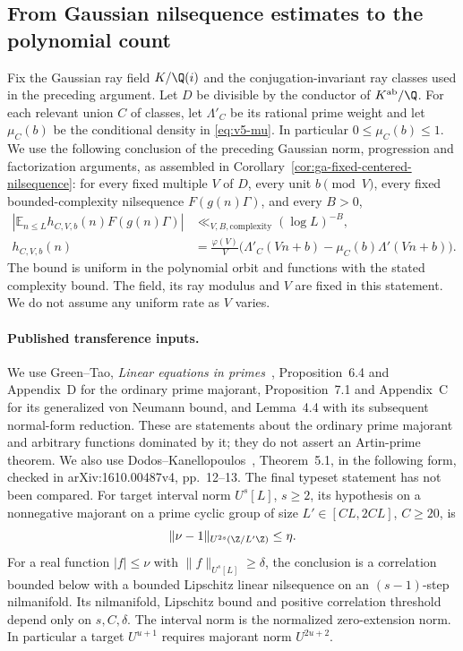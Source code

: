 \subsection{From Gaussian nilsequence estimates to the polynomial count}
\label{subsec:gaussian-gowers-bridge}

Fix the Gaussian ray field $K/\Q(i)$ and the conjugation-invariant ray
classes used in the preceding argument. Let $D$ be divisible by the
conductor of $K^{\rm ab}/\Q$. For each relevant union $C$ of classes,
let $\Lambda'_C$ be its rational prime weight and let $\mu_C(b)$ be the
conditional density in \eqref{eq:v5-mu}. In particular
$0\leq\mu_C(b)\leq1$. We use the following conclusion of the preceding
Gaussian norm, progression and factorization arguments, as assembled in
Corollary~\ref{cor:ga-fixed-centered-nilsequence}: for every fixed
multiple $V$ of $D$, every unit $b\pmod V$, every fixed bounded-complexity
nilsequence $F(g(n)\Gamma)$, and every $B>0$,
\begin{equation}\label{eq:gaussian-centered-nil-input}
\begin{aligned}
 \left|\mathbb E_{n\leq L}h_{C,V,b}(n)F(g(n)\Gamma)\right|
 &\ll_{V,B,\mathrm{complexity}}(\log L)^{-B},\\
 h_{C,V,b}(n)&=\frac{\varphi(V)}V
 \bigl(\Lambda'_C(Vn+b)-\mu_C(b)\Lambda'(Vn+b)\bigr).
\end{aligned}
\end{equation}
The bound is uniform in the polynomial orbit and functions with the stated
complexity bound. The field, its ray modulus and $V$ are fixed in this
statement. We do not assume any uniform rate as $V$ varies.

\paragraph{Published transference inputs.}
We use Green--Tao, \emph{Linear equations in primes}~\cite{greentao},
Proposition~6.4 and Appendix~D for the ordinary prime majorant,
Proposition~7.1 and Appendix~C for its generalized von Neumann bound,
and Lemma~4.4 with its subsequent normal-form reduction.
These are statements about the ordinary prime majorant and arbitrary
functions dominated by it; they do not assert an Artin-prime theorem.
We also use Dodos--Kanellopoulos~\cite{v5dk}, Theorem~5.1, in the
following form, checked in arXiv:1610.00487v4, pp.~12--13. The final
typeset statement has not been compared. For target interval norm $U^s[L]$, $s\geq2$, its hypothesis on a
nonnegative majorant on a prime cyclic group of size
$L'\in[CL,2CL]$, $C\geq20$, is
\begin{equation}\label{eq:gaussian-dk-correct-exponent}
 \|\nu-1\|_{U^{2s}(\Z/L'\Z)}\leq\eta.
\end{equation}
For a real function $|f|\leq\nu$ with $\|f\|_{U^s[L]}\geq\delta$,
the conclusion is a correlation bounded below with a bounded Lipschitz
linear nilsequence on an $(s-1)$-step nilmanifold. Its nilmanifold,
Lipschitz bound and positive correlation threshold depend only on
$s,C,\delta$. The interval norm is the normalized zero-extension norm.
In particular a target $U^{u+1}$ requires majorant norm $U^{2u+2}$.

